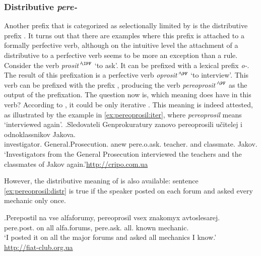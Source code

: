 \subsubsection{Distributive \textit{pere-}}
Another prefix that is categorized as selectionally limited by \citet{Tatevosov:09} is the distributive prefix . It turns out that there are examples where this prefix is attached to a formally perfective verb, although on the intuitive level the attachment of a distributive  to a perfective verb seems to be more an exception than a rule. Consider the verb \textit{prosit'}$^{\IPF}$ `to ask'. It can be prefixed with a lexical prefix \textit{o-}. The result of this prefixation is a perfective verb \textit{oprosit'}$^{\PF}$ `to interview'. This verb can be prefixed with the prefix , producing the verb \textit{pereoprosit'}$^{\PF}$ as the output of the prefixation. The question now is, which meaning does  have in this verb? According to \citet{Tatevosov:09}, it could be only iterative . This meaning is indeed attested, as illustrated by the example in \ref{ex:pereoprosil:iter}, where \textit{pereoprosil} means `interviewed again'.
\exg.\label{ex:pereoprosil:iter}Sledovateli Genprokuratury zanovo pereoprosili u\v{c}itelej i odnoklassnikov Jakova.\\
investigator. General.Prosecution. anew pere.o.ask. teacher. and classmate. Jakov.\\
\trans `Investigators from the General Prosecution interviewed the teachers and the classmates of Jakov again.'\hbox{}\hfill\hbox{\url{http://cripo.com.ua}}

However, the distributive meaning of  is also available: sentence \ref{ex:pereoprosil:distr} is true if the speaker posted on each forum and asked every mechanic only once.

\exg.\label{ex:pereoprosil:distr}Perepostil na vse alfaforumy, pereoprosil vsex znakomyx avtoslesarej.\\ 
pere.post. on all {alfa.forums}, pere.ask. all. known mechanic.\\
\trans `I posted it on all the major forums and asked all mechanics I know.'\\\hbox{}\hfill\hbox{\url{http://fiat-club.org.ua}}

